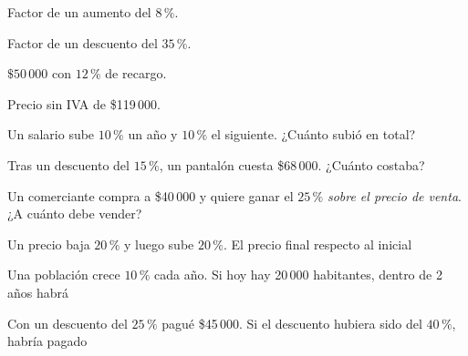 \taller
{}
\begin{ejercicios}[2]
\item Factor de un aumento del $8\,\%$. 
\item Factor de un descuento del $35\,\%$. 
\item $\$50\,000$ con $12\,\%$ de recargo. 
\item Precio sin IVA de \$119\,000. 
\end{ejercicios}
\begin{ejercicios}
\item Un salario sube $10\,\%$ un año y $10\,\%$ el siguiente. ¿Cuánto subió en total? 
\item Tras un descuento del $15\,\%$, un pantalón cuesta \$68\,000. ¿Cuánto costaba? 
\item Un comerciante compra a \$40\,000 y quiere ganar el $25\,\%$ \emph{sobre el precio de venta}. ¿A cuánto debe vender? 
\end{ejercicios}
\begin{ejercicios}
\item Un precio baja $20\,\%$ y luego sube $20\,\%$. El precio final respecto al inicial
\item Una población crece $10\,\%$ cada año. Si hoy hay 20\,000 habitantes, dentro de 2 años habrá
\item Con un descuento del $25\,\%$ pagué \$45\,000. Si el descuento hubiera sido del $40\,\%$, habría pagado
\end{ejercicios}

\bitacora

